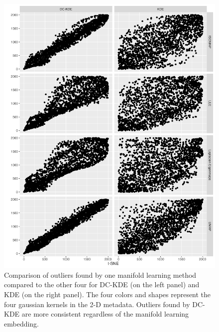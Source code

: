 \documentclass[11pt,a4paper,]{article}
\begin{document}
\begin{figure}

{\centering \includegraphics[width=0.95\linewidth]{figures/Twin Peak2000_density_compare_tsnevs4ml_radius8_r0_5_rank} 

}

\caption{Comparison of outliers found by one manifold learning method compared to the other four for DC-KDE (on the left panel) and KDE (on the right panel). The four colors and shapes represent the four gaussian kernels in the 2-D metadata. Outliers found by DC-KDE are more consistent regardless of the manifold learning embedding.}\label{fig:tpllevs4ml-3}
\end{figure}
\end{document}
